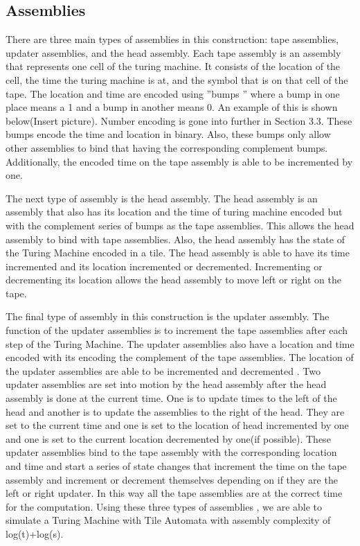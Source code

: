 \documentclass{article}
\begin{document}
\subsection{Assemblies}
There are three main types of assemblies in this construction: tape assemblies, updater
assemblies, and the head assembly.  Each tape assembly is an assembly that represents one cell of
the turing machine.  It consists of the location of the cell, the time the turing machine is at,
and the symbol that is on that cell of the tape.  The location and time are encoded using ''bumps
'' where a bump in one place means a 1 and a bump in another means 0.  An example of this is shown
below(Insert picture).  Number encoding is gone into further in Section 3.3.  These bumps encode
the time and location in binary.
Also, these bumps only allow other assemblies to bind that having the
corresponding complement bumps.  Additionally, the encoded time on the tape assembly is able to be
incremented by one.

The next type of assembly is the head assembly.  The head assembly is an assembly that also has its
location and the time of turing machine encoded but with the complement series of bumps as the tape
assemblies.  This allows the head assembly to bind with tape assemblies.
Also, the head assembly has the state of the Turing Machine encoded in a tile.  The
head assembly is able to have its time incremented and its location incremented or decremented.
Incrementing or decrementing its location allows the head assembly to move left or right on the
tape.

The final type of assembly in this construction is the updater assembly.  The function of the
updater assemblies is to increment the tape assemblies after each step of the Turing Machine.  The
updater assemblies also have a location and time encoded with its encoding the complement of the
tape assemblies.  The location of the updater assemblies are able to be incremented and decremented
.  Two updater assemblies are set into motion by the head assembly after the head assembly is done
at the current time.  One is to update times to the left of the head and another is to update the
assemblies to the right of the head.  They are set to the current time and one is set to the
location of head incremented by one and one is set to the current location decremented by one(if
possible).  These updater assemblies bind to the tape assembly with the corresponding location and
time and start a series of state changes that increment the time on the tape assembly and increment
or decrement themselves depending on if they are the left or right updater.  In this way all the
tape assemblies are at the correct time for the computation.  Using these three types of assemblies
, we are able to simulate a Turing Machine with Tile Automata with assembly complexity of
log(t)+log(s).
\end{document}
